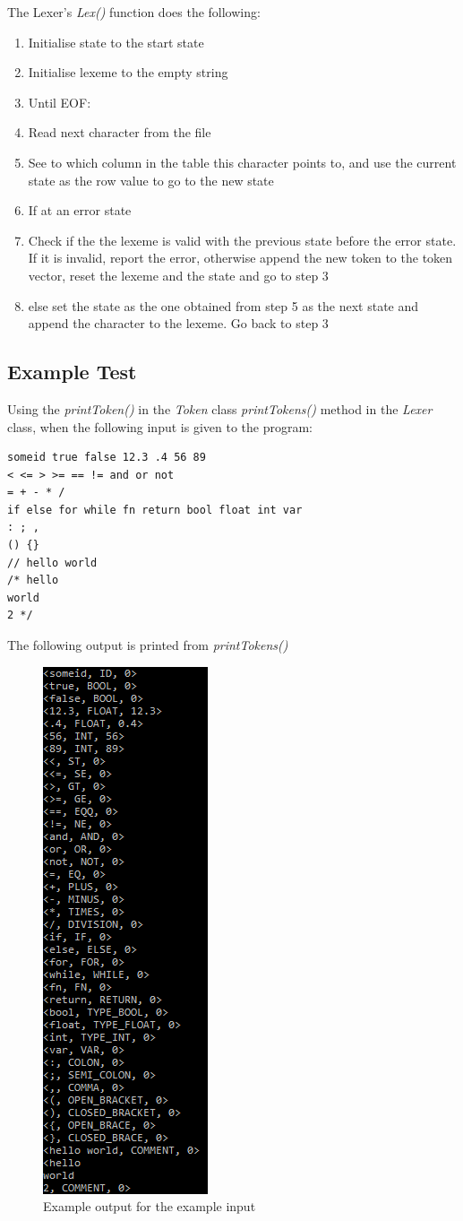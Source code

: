 The Lexer's \textit{Lex()} function does the following:
\begin{enumerate}
	\item Initialise state to the start state
	\item Initialise lexeme to the empty string
	\item Until EOF:
	\item \quad Read next character from the file
	\item \quad See to which column in the table this character points to, and use the current state as the row value to go to the new state
	\item \quad If at an error state
	\item \quad \quad Check if the the lexeme is valid with the previous state before the error state. If it is invalid, report the error, otherwise append the new token to the token vector, reset the lexeme and the state and go to step 3
	\item \quad else set the state as the one obtained from step 5 as the next state and append the character to the lexeme. Go back to step 3
\end{enumerate}

\subsection{Example Test}
Using the \textit{printToken()} in the \textit{Token} class \textit{printTokens()} method in the \textit{Lexer} class, when the following input is given to the program:
\begin{lstlisting}
someid true false 12.3 .4 56 89
< <= > >= == != and or not
= + - * /
if else for while fn return bool float int var
: ; ,
() {}
// hello world
/* hello 
world
2 */
\end{lstlisting}
The following output is printed from \textit{printTokens()}

\begin{figure}[H]
	\centering
	\includegraphics[scale=1]{Images/Q1_ExampleTest.png}
	\caption{Example output for the example input}
\end{figure}

